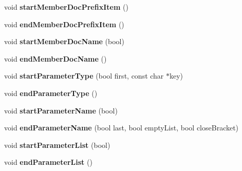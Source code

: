 \begin{DoxyCompactItemize}
\item 
\hypertarget{class_html_generator_a69e0980a62e287e8543cc10ac407483b}{void {\bfseries start\-Member\-Doc\-Prefix\-Item} ()}\label{class_html_generator_a69e0980a62e287e8543cc10ac407483b}

\item 
\hypertarget{class_html_generator_a797315065ef118ee81fc1828eb5f7e5d}{void {\bfseries end\-Member\-Doc\-Prefix\-Item} ()}\label{class_html_generator_a797315065ef118ee81fc1828eb5f7e5d}

\item 
\hypertarget{class_html_generator_a75e84ed33d454731b67946c1eec42c8e}{void {\bfseries start\-Member\-Doc\-Name} (bool)}\label{class_html_generator_a75e84ed33d454731b67946c1eec42c8e}

\item 
\hypertarget{class_html_generator_ab8f5f35025a2dfa4026e02e5e586b27e}{void {\bfseries end\-Member\-Doc\-Name} ()}\label{class_html_generator_ab8f5f35025a2dfa4026e02e5e586b27e}

\item 
\hypertarget{class_html_generator_a563b7005db4ba17663f4f4b32b816b94}{void {\bfseries start\-Parameter\-Type} (bool first, const char $\ast$key)}\label{class_html_generator_a563b7005db4ba17663f4f4b32b816b94}

\item 
\hypertarget{class_html_generator_a1e61ed71851d9423940748df3342715b}{void {\bfseries end\-Parameter\-Type} ()}\label{class_html_generator_a1e61ed71851d9423940748df3342715b}

\item 
\hypertarget{class_html_generator_aaa80b6d46b0b3f69f5604a6394aad2de}{void {\bfseries start\-Parameter\-Name} (bool)}\label{class_html_generator_aaa80b6d46b0b3f69f5604a6394aad2de}

\item 
\hypertarget{class_html_generator_a6cb400e2e9f3c7d165a0b7ecf471ae08}{void {\bfseries end\-Parameter\-Name} (bool last, bool empty\-List, bool close\-Bracket)}\label{class_html_generator_a6cb400e2e9f3c7d165a0b7ecf471ae08}

\item 
\hypertarget{class_html_generator_a61b1ab9b798f5af0ec297a1b70b943eb}{void {\bfseries start\-Parameter\-List} (bool)}\label{class_html_generator_a61b1ab9b798f5af0ec297a1b70b943eb}

\item 
\hypertarget{class_html_generator_a18eb29acbeb3f72b0d8f4ea23b21f054}{void {\bfseries end\-Parameter\-List} ()}\label{class_html_generator_a18eb29acbeb3f72b0d8f4ea23b21f054}


\end{DoxyCompactItemize}
